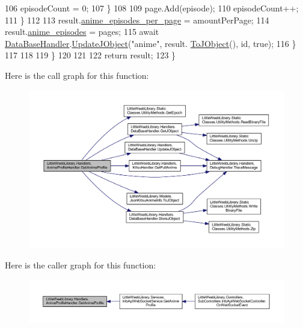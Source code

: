 \begin{DoxyCode}
106                             episodeCount = 0;
107                         \}
108 
109                         page.Add(episode);
110                         episodeCount++;
111                     \}
112 
113                     result.\mbox{\hyperlink{class_little_weeb_library_1_1_models_1_1_json_kitsu_anime_info_a11a2513ce95fe17d206eeb738811d087}{anime\_episodes\_per\_page}} = amountPerPage;
114                     result.\mbox{\hyperlink{class_little_weeb_library_1_1_models_1_1_json_kitsu_anime_info_ae788c0962dabe5e210fba53aecae820d}{anime\_episodes}} = pages;
115                     await \mbox{\hyperlink{class_little_weeb_library_1_1_handlers_1_1_anime_profile_handler_a4764b15d1f2aaf7d21aa461508a08a62}{DataBaseHandler}}.\mbox{\hyperlink{interface_little_weeb_library_1_1_handlers_1_1_i_data_base_handler_a00c429576be33aa60bdf1a88edaf88c6}{UpdateJObject}}(\textcolor{stringliteral}{"anime"}, result.
      \mbox{\hyperlink{class_little_weeb_library_1_1_models_1_1_json_kitsu_anime_info_a2c92ffb7d523c4f75497988156b64b7b}{ToJObject}}(), id, \textcolor{keyword}{true});
116                 \}
117 
118 
119             \}
120 
121 
122             \textcolor{keywordflow}{return} result;
123         \}
\end{DoxyCode}
Here is the call graph for this function\+:\nopagebreak
\begin{figure}[H]
\begin{center}
\leavevmode
\includegraphics[width=350pt]{class_little_weeb_library_1_1_handlers_1_1_anime_profile_handler_aaa89fba506cfcdad18a5aa3f9b860061_cgraph}
\end{center}
\end{figure}
Here is the caller graph for this function\+:\nopagebreak
\begin{figure}[H]
\begin{center}
\leavevmode
\includegraphics[width=350pt]{class_little_weeb_library_1_1_handlers_1_1_anime_profile_handler_aaa89fba506cfcdad18a5aa3f9b860061_icgraph}
\end{center}
\end{figure}
